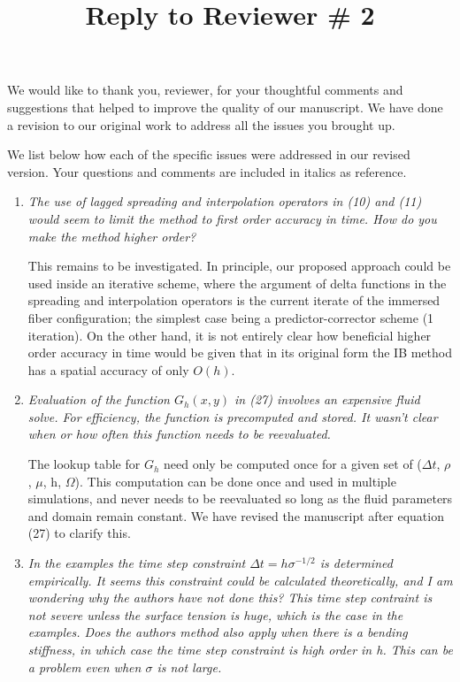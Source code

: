 \documentclass[12pt]{article}
\title{Reply to Reviewer \# 2}
\author{}
\begin{document}
\maketitle
We would like to thank you,  reviewer,  for your thoughtful  comments and suggestions that helped to improve the quality of our manuscript. 
We have done a revision to our original work to address all the issues you brought up.


We list below how each of the specific issues were addressed in our revised version. Your questions and comments are included in italics as reference.



\begin{enumerate}
\item {\em The use of lagged spreading and interpolation operators in (10) and
(11) would seem to limit the method to first order accuracy in time. How do you make the method higher order?}

This remains to be investigated. In principle, our proposed approach could be used inside an iterative scheme, where the argument of delta functions in the spreading and interpolation operators is the current iterate of the immersed fiber configuration; the simplest case being a predictor-corrector scheme (1 iteration). On the other hand, it is not entirely clear how beneficial higher order accuracy in time would be given that in its original form the IB method
has a spatial accuracy of only $O(h)$. 

\item {\em Evaluation of the function $G_h(x, y)$ in (27) involves an expensive
fluid solve. For efficiency, the function is precomputed and stored. It
wasn't clear when or how often this function needs to be reevaluated.}

The lookup table for $G_h$ need only be computed once for a given set of ($\Delta t$, $\rho$, $\mu$, h, $\Omega$). This computation can be done once and
used in multiple simulations, and never needs to be reevaluated so long as the fluid parameters and domain remain constant. We have revised the manuscript after equation (27) to clarify this.

\item {\em In the examples the time step constraint $\Delta t = h \sigma^{-1/2}$ is determined empirically. It seems this constraint could be calculated
theoretically, and I am wondering why the authors have not done this? This
time step contraint is not severe unless the surface tension is huge,
which is the case in the examples. Does the authors method also apply when
there is a bending stiffness, in which case the time step constraint is
high order in h. This can be a problem even when $\sigma$ is not large.}


\end{enumerate}
\end{document}
